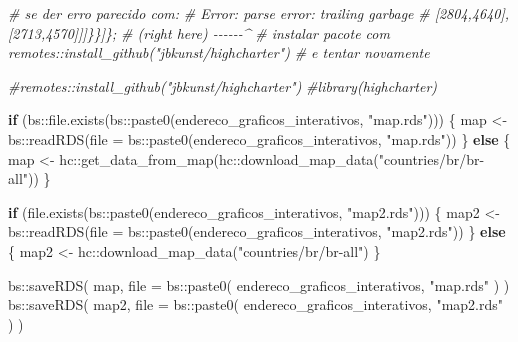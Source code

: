 \documentclass[
]{article}
\newenvironment{Shaded}{\begin{snugshade}}{\end{snugshade}}
\newcommand{\AttributeTok}[1]{\textcolor[rgb]{0.77,0.63,0.00}{#1}}
\newcommand{\CommentTok}[1]{\textcolor[rgb]{0.56,0.35,0.01}{\textit{#1}}}
\newcommand{\ControlFlowTok}[1]{\textcolor[rgb]{0.13,0.29,0.53}{\textbf{#1}}}
\newcommand{\FunctionTok}[1]{\textcolor[rgb]{0.00,0.00,0.00}{#1}}
\newcommand{\NormalTok}[1]{#1}
\newcommand{\OtherTok}[1]{\textcolor[rgb]{0.56,0.35,0.01}{#1}}
\newcommand{\SpecialCharTok}[1]{\textcolor[rgb]{0.00,0.00,0.00}{#1}}
\newcommand{\StringTok}[1]{\textcolor[rgb]{0.31,0.60,0.02}{#1}}
\begin{document}
\begin{Shaded}
\begin{Highlighting}[]
\CommentTok{\# se der erro parecido com:}
\CommentTok{\# Error: parse error: trailing garbage}
\CommentTok{\#          [2804,4640],[2713,4570]]]\}\}]\};}
\CommentTok{\#                     (right here) {-}{-}{-}{-}{-}{-}\^{}}
\CommentTok{\# instalar pacote com remotes::install\_github("jbkunst/highcharter")}
\CommentTok{\# e tentar novamente}

\CommentTok{\#remotes::install\_github("jbkunst/highcharter")}
\CommentTok{\#library(highcharter)}

\ControlFlowTok{if}\NormalTok{ (bs}\SpecialCharTok{::}\FunctionTok{file.exists}\NormalTok{(bs}\SpecialCharTok{::}\FunctionTok{paste0}\NormalTok{(endereco\_graficos\_interativos, }\StringTok{"map.rds"}\NormalTok{))) \{}
\NormalTok{    map }\OtherTok{\textless{}{-}}\NormalTok{ bs}\SpecialCharTok{::}\FunctionTok{readRDS}\NormalTok{(}\AttributeTok{file =}\NormalTok{ bs}\SpecialCharTok{::}\FunctionTok{paste0}\NormalTok{(endereco\_graficos\_interativos, }\StringTok{"map.rds"}\NormalTok{))}
\NormalTok{\} }\ControlFlowTok{else}\NormalTok{ \{}
\NormalTok{    map }\OtherTok{\textless{}{-}}\NormalTok{ hc}\SpecialCharTok{::}\FunctionTok{get\_data\_from\_map}\NormalTok{(hc}\SpecialCharTok{::}\FunctionTok{download\_map\_data}\NormalTok{(}\StringTok{"countries/br/br{-}all"}\NormalTok{))}
\NormalTok{\}}

\ControlFlowTok{if}\NormalTok{ (}\FunctionTok{file.exists}\NormalTok{(bs}\SpecialCharTok{::}\FunctionTok{paste0}\NormalTok{(endereco\_graficos\_interativos, }\StringTok{"map2.rds"}\NormalTok{))) \{}
\NormalTok{    map2 }\OtherTok{\textless{}{-}}\NormalTok{ bs}\SpecialCharTok{::}\FunctionTok{readRDS}\NormalTok{(}\AttributeTok{file =}\NormalTok{ bs}\SpecialCharTok{::}\FunctionTok{paste0}\NormalTok{(endereco\_graficos\_interativos, }\StringTok{"map2.rds"}\NormalTok{))}
\NormalTok{\} }\ControlFlowTok{else}\NormalTok{ \{}
\NormalTok{    map2 }\OtherTok{\textless{}{-}}\NormalTok{ hc}\SpecialCharTok{::}\FunctionTok{download\_map\_data}\NormalTok{(}\StringTok{"countries/br/br{-}all"}\NormalTok{)}
\NormalTok{\}}

\NormalTok{bs}\SpecialCharTok{::}\FunctionTok{saveRDS}\NormalTok{(}
\NormalTok{    map,}
    \AttributeTok{file =}\NormalTok{ bs}\SpecialCharTok{::}\FunctionTok{paste0}\NormalTok{(}
\NormalTok{        endereco\_graficos\_interativos,}
        \StringTok{"map.rds"}
\NormalTok{    )}
\NormalTok{)}
\NormalTok{bs}\SpecialCharTok{::}\FunctionTok{saveRDS}\NormalTok{(}
\NormalTok{    map2,}
    \AttributeTok{file =}\NormalTok{ bs}\SpecialCharTok{::}\FunctionTok{paste0}\NormalTok{(}
\NormalTok{        endereco\_graficos\_interativos,}
        \StringTok{"map2.rds"}
\NormalTok{    )}
\NormalTok{)}


\end{Highlighting}
\end{Shaded}
\end{document}
